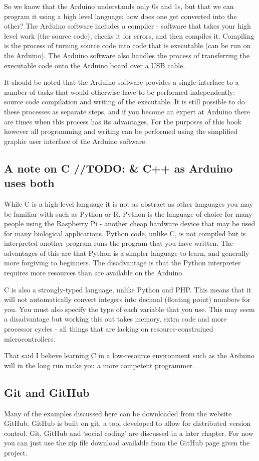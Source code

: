 \documentclass[
]{book}
\begin{document}
So we know that the Arduino understands only 0s and 1s, but that we can program it using a high level language; how does one get converted into the other? The Arduino software includes a compiler - software that takes your high level work (the source code), checks it for errors, and then compiles it. Compiling is the process of turning source code into code that is executable (can be run on the Arduino). The Arduino software also handles the process of transferring the executable code onto the Arduino board over a USB cable.

It should be noted that the Arduino software provides a single interface to a number of tasks that would otherwise have to be performed independently: source code compilation and writing of the executable. It is still possible to do these processes as separate steps, and if you become an expert at Arduino there are times when this process has its advantages. For the purposes of this book however all programming and writing can be performed using the simplified graphic user interface of the Arduino software.

\subsection{A note on C //TODO: \& C++ as Arduino uses both}\label{a-note-on-c-todo-c-as-arduino-uses-both}

While C is a high-level language it is not as abstract as other languages you may be familiar with such as Python or R. Python is the language of choice for many people using the Raspberry Pi - another cheap hardware device that may be used for many biological applications. Python code, unlike C, is not compiled but is interpreted another program runs the program that you have written. The advantages of this are that Python is a simpler language to learn, and generally more forgiving to beginners. The disadvantage is that the Python interpreter requires more resources than are available on the Arduino.

C is also a strongly-typed language, unlike Python and PHP. This means that it will not automatically convert integers into decimal (floating point) numbers for you. You must also specify the type of each variable that you use. This may seem a disadvantage but working this out takes memory, extra code and more processor cycles - all things that are lacking on resource-constrained microcontrollers.

That said I believe learning C in a low-resource environment such as the Arduino will in the long run make you a more competent programmer.

\subsection{Git and GitHub}\label{git-and-github}

Many of the examples discussed here can be downloaded from the website GitHub. GitHub is built on git, a tool developed to allow for distributed version control. Git, GitHub and `social coding' are discussed in a later chapter. For now you can just use the zip file download available from the GitHub page given the project.

  
\end{document}
